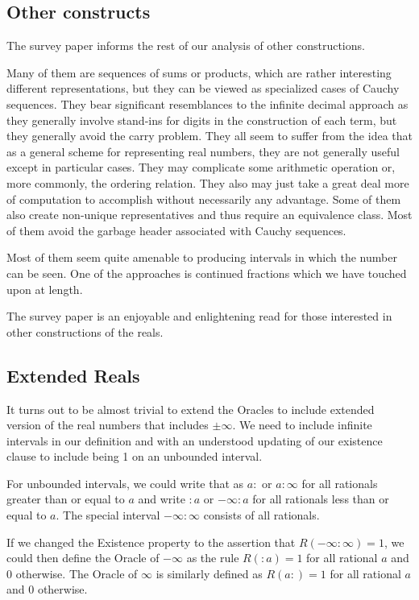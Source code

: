 \documentclass[12pt]{article}
\theoremstyle{remark}
\begin{document}
\subsection{Other constructs}

The survey paper informs the rest of our analysis of other constructions. 

Many of them are sequences of sums or products, which are rather interesting different representations, but they can be viewed as specialized cases of Cauchy sequences. They bear significant resemblances to the infinite decimal approach as they generally involve stand-ins for digits in the construction of each term, but they generally avoid the carry problem. They all seem to suffer from the idea that as a general scheme for representing real numbers, they are not generally useful except in particular cases. They may complicate some arithmetic operation or, more commonly, the ordering relation. They also may just take a great deal more of computation to accomplish without necessarily any advantage. Some of them also create non-unique representatives and thus require an equivalence class. Most of them avoid the garbage header associated with Cauchy sequences. 

Most of them seem quite amenable to producing intervals in which the number can be seen. One of the approaches is continued fractions which we have touched upon at length. 

The survey paper is an enjoyable and enlightening read for those interested in other constructions of the reals. 

\subsection{Extended Reals}

It turns out to be almost trivial to extend the Oracles to include extended version of the real numbers that includes $\pm \infty$. We need to include infinite intervals in our definition and with an understood updating of our existence clause to include being 1 on an unbounded interval.

For unbounded intervals, we could write that as $a:$ or $a:\infty$ for all rationals greater than or equal to $a$ and write $:a$ or $-\infty:a$ for all rationals less than or equal to $a$. The special interval $-\infty:\infty$ consists of all rationals. 

If we changed the Existence property to the assertion that $R(-\infty:\infty)=1$, we could then define the Oracle of $-\infty$ as the rule $R(:a) = 1$ for all rational $a$ and 0 otherwise. The Oracle of $\infty$ is similarly defined as $R(a:)=1$  for all rational $a$ and 0 otherwise. 
\end{document}
